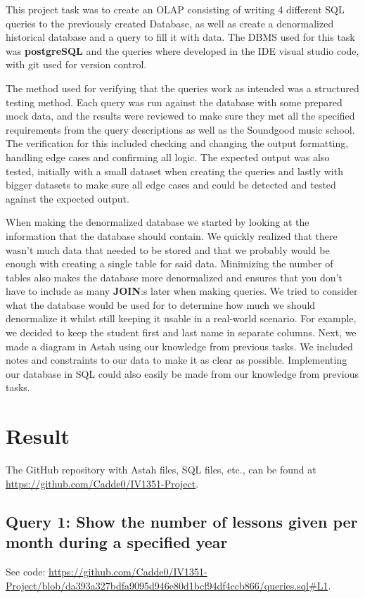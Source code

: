 \documentclass[a4paper]{scrartcl}
\begin{document}
This project task was to create an OLAP consisting of writing 4 different SQL queries to the previously created Database, as well as create a denormalized historical database and a query to fill it with data. The DBMS used for this task was \textbf{postgreSQL} and the queries where developed in the IDE visual studio code, with git used for version control. 

The method used for verifying that the queries work as intended was a structured testing method. Each query was run against the database with some prepared mock data, and the results were reviewed to make sure they met all the specified requirements from the query descriptions as well as the Soundgood music school. The verification for this included checking and changing the output formatting, handling edge cases and confirming all logic. The expected output was also tested, initially with a small dataset when creating the queries and lastly with bigger datasets to make sure all edge cases and could be detected and tested against the expected output.

When making the denormalized database we started by looking at the information that the database should contain. We quickly realized that there wasn't much data that needed to be stored and that we probably would be enough with creating a single table for said data. Minimizing the number of tables also makes the database more denormalized and ensures that you don't have to include as many \textbf{JOIN}:s later when making queries. We tried to consider what the database would be used for to determine how much we should denormalize it whilst still keeping it usable in a real-world scenario. For example, we decided to keep the student first and last name in separate columns. Next, we made a diagram in Astah using our knowledge from previous tasks. We included notes and constraints to our data to make it as clear as possible. Implementing our database in SQL could also easily be made from our knowledge from previous tasks.

\section{Result}

The GitHub repository with Astah files, SQL files, etc., can be found at \url{https://github.com/Cadde0/IV1351-Project}.

\subsection{Query 1: Show the number of lessons given per month during a specified year}
See code: \url{https://github.com/Cadde0/IV1351-Project/blob/da393a327bdfa9095d946e80d1bcf94df4ccb866/queries.sql#L1}.
\end{document}
